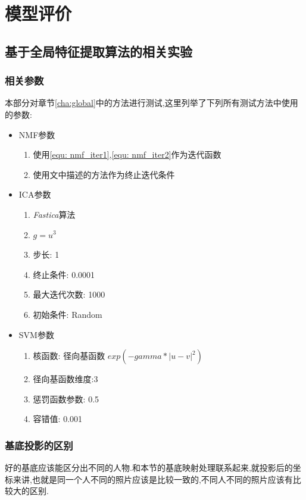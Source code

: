 \chapter{模型评价}

\section{基于全局特征提取算法的相关实验}
\label{sec:comp_global}
\subsection{相关参数}
本部分对章节\ref{cha:global}中的方法进行测试,这里列举了下列所有测试方法中使用的参数:
\begin{itemize}
	\item NMF参数
		\begin{enumerate}
		\item 使用\ref{equ: nmf_iter1},\ref{equ: nmf_iter2}作为迭代函数
		\item 使用文中描述的方法作为终止迭代条件			
		\end{enumerate}
	\item ICA参数 \begin{enumerate}
		\item \textit{Fastica}算法
		\item $g = u^3$
		\item 步长: 1
		\item 终止条件: 0.0001
		\item 最大迭代次数: 1000
		\item 初始条件: Random	\end{enumerate}
	\item SVM参数 \begin{enumerate}
		\item 核函数: 径向基函数 $exp(-gamma*|u-v|^2)$
		\item 径向基函数维度:3
		\item 惩罚函数参数: 0.5
		\item 容错值: 0.001	\end{enumerate}
\end{itemize}
		
\subsection{基底投影的区别}
\label{sec:pnibase}
好的基底应该能区分出不同的人物.和本节的基底映射处理联系起来,就投影后的坐标来讲,也就是同一个人不同的照片应该是比较一致的,不同人不同的照片应该有比较大的区别.\newline

